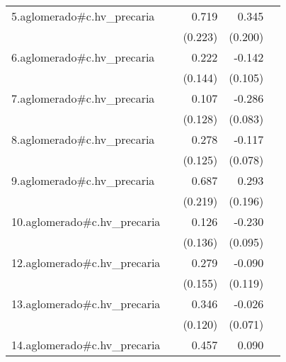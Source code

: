 {\begin{longtable}{l*{4}{D{.}{.}{-1}}}
\addlinespace
5.aglomerado#c.hv\_precaria&                     &       0.719\sym{**} &       0.345         &                     \\
            &                     &     (0.223)         &     (0.200)         &                     \\
\addlinespace
6.aglomerado#c.hv\_precaria&                     &       0.222         &      -0.142         &                     \\
            &                     &     (0.144)         &     (0.105)         &                     \\
\addlinespace
7.aglomerado#c.hv\_precaria&                     &       0.107         &      -0.286\sym{***}&                     \\
            &                     &     (0.128)         &     (0.083)         &                     \\
\addlinespace
8.aglomerado#c.hv\_precaria&                     &       0.278\sym{*}  &      -0.117         &                     \\
            &                     &     (0.125)         &     (0.078)         &                     \\
\addlinespace
9.aglomerado#c.hv\_precaria&                     &       0.687\sym{**} &       0.293         &                     \\
            &                     &     (0.219)         &     (0.196)         &                     \\
\addlinespace
10.aglomerado#c.hv\_precaria&                     &       0.126         &      -0.230\sym{*}  &                     \\
            &                     &     (0.136)         &     (0.095)         &                     \\
\addlinespace
12.aglomerado#c.hv\_precaria&                     &       0.279         &      -0.090         &                     \\
            &                     &     (0.155)         &     (0.119)         &                     \\
\addlinespace
13.aglomerado#c.hv\_precaria&                     &       0.346\sym{**} &      -0.026         &                     \\
            &                     &     (0.120)         &     (0.071)         &                     \\
\addlinespace
14.aglomerado#c.hv\_precaria&                     &       0.457\sym{*}  &       0.090         &                     \\

\end{longtable}}
